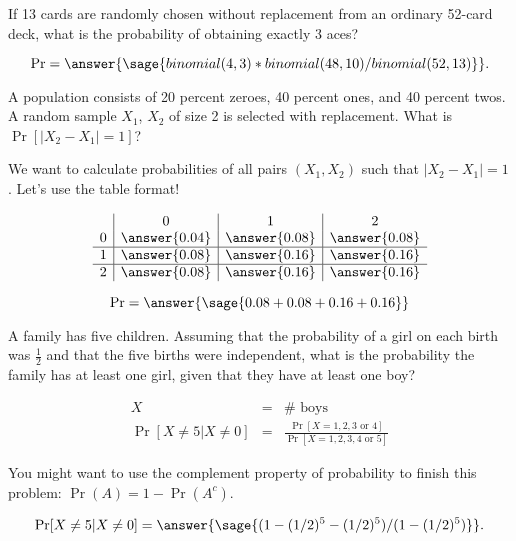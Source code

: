 \documentclass{ximera}
\begin{document}
\begin{problem}
If 13 cards are randomly chosen without replacement from an ordinary 52-card deck, what is the probability of obtaining exactly 3 aces? 

\begin{prompt}
$$\Pr=\answer{\sage{binomial(4,3)*binomial(48,10)/binomial(52,13)}}.$$
\end{prompt}

\end{problem}

\begin{problem}
A population consists of 20 percent zeroes, 40 percent ones, and 40 percent twos. A random sample $X_1$, $X_2$ of size 2 is selected with replacement. What is $\Pr[|X_2-X_1|=1]$?
\begin{hint}
We want to calculate probabilities of all pairs $(X_1,X_2)$ such that $|X_2-X_1|=1$. Let's use the table format!
\end{hint}


\begin{prompt}
$$
\begin{array}{c|c|c|c}
  & 0 & 1 & 2 \\
0 &\answer{0.04} & \answer{0.08} & \answer{0.08} \\
\hline
1 &\answer{0.08} & \answer{0.16} & \answer{0.16} \\
\hline
2 &\answer{0.08} & \answer{0.16} & \answer{0.16} \\
\end{array}
$$

$$\Pr=\answer{\sage{0.08+0.08+0.16+0.16}}$$
\end{prompt}

\end{problem}

\begin{problem}
A family has five children. Assuming that the probability of a girl on each birth was $\frac{1}{2}$ and that the five births were independent, what is the probability the family has at least one girl, given that they have at least one boy? 
\begin{hint}
\begin{eqnarray*} X&=& \# \text{ boys } \\ 
\Pr[X \not= 5 | X \not= 0 ] &=&\frac{\Pr[X=1,2,3\text{ or }4]}{\Pr[X=1,2,3,4 \text{ or }5]} \end{eqnarray*} 

You might want to use the complement property of probability to finish this problem: $\Pr(A)=1-\Pr(A^c)$.
\end{hint}

\begin{prompt}
$$\Pr[X \not= 5 | X \not= 0 ]=\answer{\sage{(1-(1/2)^5-(1/2)^5)/(1-(1/2)^5)}}.$$
\end{prompt}

\end{problem}
\end{document}
